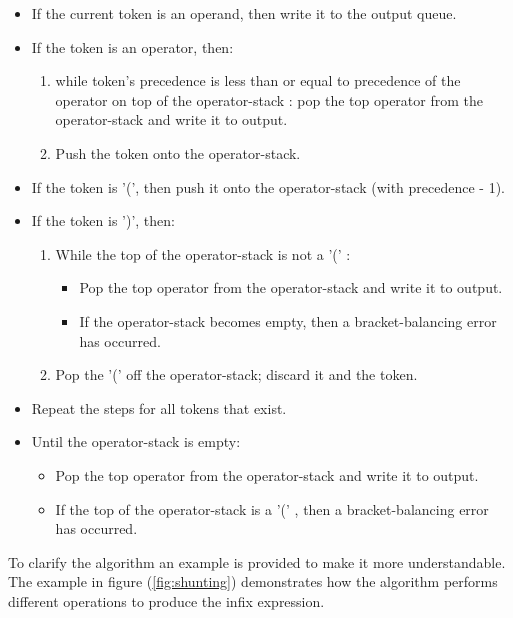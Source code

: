 \documentclass[10pt, a4paper, titlepage]{article}
\begin{document}
\begin{itemize}
\item If the current token is an operand, then write it to the output queue.
\item If the token is an operator, then: 
\begin{enumerate}
\item while  token's precedence is less than or equal to precedence of the operator on top of the operator-stack : pop the top operator from the operator-stack and write it to output.
\item Push the token onto the operator-stack.
\end{enumerate}
\item If the token is '(', then push it onto the operator-stack (with precedence - 1).
\item If the token is ')', then:
\begin{enumerate}

\item While the top of the operator-stack is not a '(' : 

\begin{itemize}
\item Pop the top operator from the operator-stack and write it to output.
\item If the operator-stack becomes empty, then a bracket-balancing error has occurred.
\end{itemize}

\item Pop the '(' off the operator-stack; discard it and the token.
\end{enumerate} 

\item Repeat the steps for all tokens that exist.
\item Until the operator-stack is empty: 
\begin{itemize}
\item Pop the top operator from the operator-stack and write it to output.
\item If the top of the operator-stack is a '(' , then a bracket-balancing error has occurred.
\end{itemize}

\end{itemize}
 
To clarify the algorithm an example is provided to make it more understandable. The example in figure (\ref{fig:shunting}) demonstrates how the algorithm performs different operations to produce the infix expression. 
 
\end{document}
